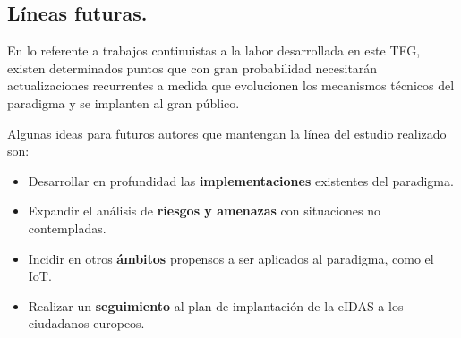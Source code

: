 \documentclass[../main.tex]{subfiles}
\begin{document}
\subsection{Líneas futuras.}\label{Líneas futuras}
En lo referente a trabajos continuistas a la labor desarrollada en este \acrshort{TFG}, existen determinados puntos que con gran probabilidad necesitarán actualizaciones recurrentes a medida que evolucionen los mecanismos técnicos del paradigma y se implanten al gran público.

Algunas ideas para futuros autores que mantengan la línea del estudio realizado son:
\begin{itemize}
    \item Desarrollar en profundidad las \textbf{implementaciones} existentes del paradigma.
    \item Expandir el análisis de \textbf{riesgos y amenazas} con situaciones no contempladas. 
    \item Incidir en otros \textbf{ámbitos} propensos a ser aplicados al paradigma, como el \acrshort{IoT}.
    \item Realizar un \textbf{seguimiento} al plan de implantación de la \acrshort{eIDAS} a los ciudadanos europeos.
\end{itemize}
\end{document}
